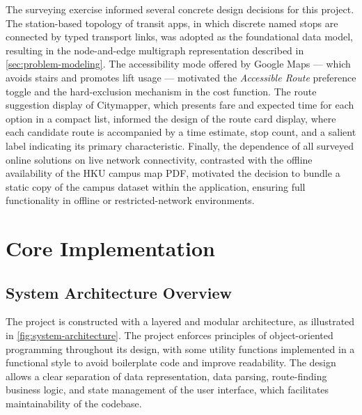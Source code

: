 \documentclass[a4paper,10pt]{amsart}
\begin{document}
The surveying exercise informed several concrete design decisions for this project.
The station-based topology of transit apps, in which discrete named stops are connected by typed transport links, was adopted as the foundational data model, resulting in the node-and-edge multigraph representation described in \autoref{sec:problem-modeling}.
The accessibility mode offered by Google Maps --- which avoids stairs and promotes lift usage --- motivated the \emph{Accessible Route} preference toggle and the hard-exclusion mechanism in the cost function.
The route suggestion display of Citymapper, which presents fare and expected time for each option in a compact list, informed the design of the route card display, where each candidate route is accompanied by a time estimate, stop count, and a salient label indicating its primary characteristic.
Finally, the dependence of all surveyed online solutions on live network connectivity, contrasted with the offline availability of the HKU campus map PDF, motivated the decision to bundle a static copy of the campus dataset within the application, ensuring full functionality in offline or restricted-network environments.

\section{Core Implementation}

\subsection{System Architecture Overview}
The project is constructed with a layered and modular architecture, as illustrated in \autoref{fig:system-architecture}.
The project enforces principles of object-oriented programming throughout its design, with some utility functions implemented in a functional style to avoid boilerplate code and improve readability.
The design allows a clear separation of data representation, data parsing, route-finding business logic, and state management of the user interface, which facilitates maintainability of the codebase.

\begin{landscape}
    \vspace*{4em}
    
    \clearpage
    
    \vspace*{1em}
    
\end{landscape}
\end{document}
